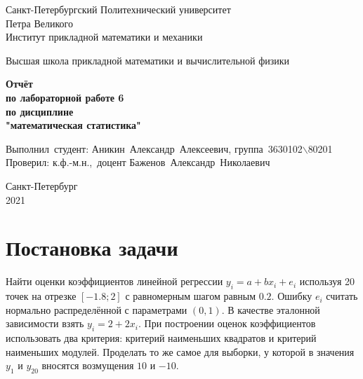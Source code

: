 \documentclass[12pt,a4paper]{article}
\begin{document}
	
	\begin{titlepage}
		
		\begin{center}
			\begin{large}
				Санкт-Петербургский Политехнический университет\\ Петра Великого\\
				Институт прикладной математики и механики\\
			\end{large}
			\vspace{0.2cm}
			Высшая школа прикладной математики и вычислительной физики\\
			
		\end{center}
		
		\vspace{3cm}
		\begin{center}
			\textbf{Отчёт\\ по лабораторной работе 6\\ по дисциплине\\ "математическая статистика"}
		\end{center}
		
		\vspace{3cm}
		\vbox{%
			\hfill%
			\vbox{%
				\hbox{Выполнил студент:}%
				\hbox{\break}
				\hbox{Аникин Александр Алексеевич,}%
				\hbox{группа 3630102$\backslash$80201}%
				\hbox{\break}
				\hbox{\break}
				\hbox{Проверил:}
				\hbox{\break}
				\hbox{к.ф.-м.н., доцент}
				\hbox{Баженов Александр Николаевич}
			}%
		} 
		\vfill
		
		\begin{center}
			Санкт-Петербург\\2021
		\end{center}
		
	\end{titlepage}
	\tableofcontents
	\newpage
	
	\listoffigures
	\newpage
	
	\section{Постановка задачи}
		Найти оценки коэффициентов линейной регрессии $y_i=a+bx_i+e_i$ используя 20 точек на отрезке $[-1.8; 2]$ с равномерным шагом равным
		$0.2$. Ошибку $e_i$ считать нормально распределённой с параметрами $(0,
		1)$. В качестве эталонной зависимости взять $y_i = 2 + 2x_i$. При построении оценок коэффициентов использовать два критерия: критерий наименьших квадратов и критерий наименьших модулей. Проделать то же самое для выборки, у которой в значения $y_1$ и $y_{20}$ вносятся
		возмущения $10$ и $-10$.
	\newpage
	
\end{document}
